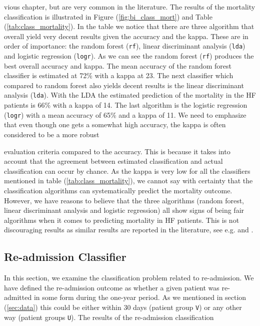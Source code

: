 \documentclass[../thesis.tex]{subfiles}
\begin{document}
\noindent vious chapter, but are very common in the literature. The results of the mortality classification is illustrated in Figure (\ref{fig:bi_class_mort}) and Table (\ref{tab:class_mortality}). In the table we notice that there are three algorithm that overall yield very decent results given the accuracy and the kappa. These are in order of importance: the random forest (\texttt{rf}), linear discriminant analysis (\texttt{lda}) and logistic regression (\texttt{logr}). As we can see the random forest (\texttt{rf}) \citep{ho1995random} produces the best overall accuracy and kappa. The mean accuracy of the random forest classifier is estimated at 72\% with a kappa at 23. The next classifier which compared to random forest also yields decent results is the linear discriminant analysis (\texttt{lda}). With the LDA the estimated prediction of the mortality in the HF patients is 66\% with a kappa of 14. The last algorithm is the logistic regression (\texttt{logr}) with a mean accuracy of 65\% and a kappa of 11. We need to emphasize that even though one gets a somewhat high accuracy, the kappa is often considered to be a more robust  



\noindent evaluation criteria compared to the accuracy. This is because it takes into account that the agreement between estimated classification and actual classification can occur by chance. As the kappa is very low for all the classifiers mentioned in table (\ref{tab:class_mortality}), we cannot say with certainty that the classification algorithms can systematically predict the mortality outcome. However, we have reasons to believe that the three algorithms (random forest, linear discriminant analysis and logistic regression) all show signs of being fair algorithms when it comes to predicting mortality in HF patients. This is not discouraging results as similar results are reported in the literature, see e.g. \cite{shah2014phenomapping} and \cite{panahiazar2015using}.

\subsection{Re-admission Classifier}

\noindent In this section, we examine the classification problem related to re-admission. We have defined the re-admission outcome as whether a given patient was re-admitted in some form during the one-year period. As we mentioned in section (\ref{sec:data}) this could be either within 30 days (patient group \texttt{V}) or any other way (patient groups \texttt{U}). The results of the re-admission classification 
\end{document}

